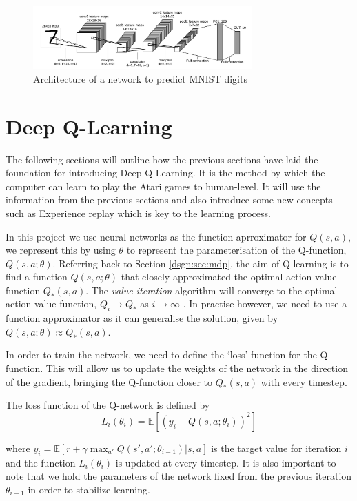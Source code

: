 \begin{figure}[htbp]
	\centering
	\includegraphics[width=0.75\textwidth]{chapters/chapter3/images/mnist.png}
	\caption{Architecture of a network to predict MNIST digits
		\label{fig:mnist-arch}
	}
\end{figure}

\section{Deep Q-Learning}
\label{dsgn:sec:dql}
The following sections will outline how the previous sections have laid the foundation for introducing Deep Q-Learning. It is the method by which the computer can learn to play the Atari games to human-level. It will use the information from the previous sections and also introduce some new concepts such as Experience replay which is key to the learning process.

In this project we use neural networks as the function aprroximator for $Q(s, a)$, we represent this by using $\theta$ to represent the parameterisation of the Q-function, $Q(s, a; \theta)$. Referring back to Section \ref{dsgn:sec:mdp}, the aim of Q-learning is to find a function $Q(s, a; \theta)$ that closely approximated the optimal action-value function $Q_*(s, a)$.
The \textit{value iteration} algorithm will converge to the optimal action-value function, $Q_i \rightarrow Q_*$ as $i \rightarrow \infty$ \cite{richardsutton2018}. In practise however, we need to use a function approximator as it can generalise the solution, given by $Q(s, a; \theta) \approx Q_*(s, a)$.

In order to train the network, we need to define the `loss' function for the Q-function. This will allow us to update the weights of the network in the direction of the gradient, bringing the Q-function closer to $Q_*(s, a)$ with every timestep.

\begin{defn}
	The loss function of the Q-network is defined by
	\[
		L_i(\theta_i) = \mathbb{E}\left[(y_i - Q(s, a; \theta_i))^2\right]
	\]
\end{defn}
where $y_i = \mathbb{E}\left[r + \gamma \max_{a'}Q(s', a'; \theta_{i - 1})\vert s, a\right]$ is the target value for iteration $i$ and the function $L_i(\theta_i)$ is updated at every timestep. It is also important to note that we hold the parameters of the network fixed from the previous iteration $\theta_{i - 1}$ in order to stabilize learning.

